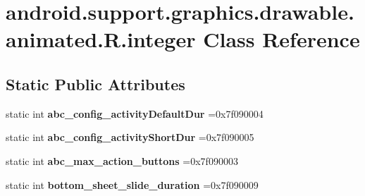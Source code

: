 \hypertarget{classandroid_1_1support_1_1graphics_1_1drawable_1_1animated_1_1R_1_1integer}{}\section{android.\+support.\+graphics.\+drawable.\+animated.\+R.\+integer Class Reference}
\label{classandroid_1_1support_1_1graphics_1_1drawable_1_1animated_1_1R_1_1integer}
\subsection*{Static Public Attributes}
\begin{DoxyCompactItemize}
\item 
\mbox{\label{classandroid_1_1support_1_1graphics_1_1drawable_1_1animated_1_1R_1_1integer_a449aa500af7a8ce23e01295a5da1255d}} 
static int {\bfseries abc\+\_\+config\+\_\+activity\+Default\+Dur} =0x7f090004
\item 
\mbox{\label{classandroid_1_1support_1_1graphics_1_1drawable_1_1animated_1_1R_1_1integer_a980a18f79f9a3e391738500043a8b230}} 
static int {\bfseries abc\+\_\+config\+\_\+activity\+Short\+Dur} =0x7f090005
\item 
\mbox{\label{classandroid_1_1support_1_1graphics_1_1drawable_1_1animated_1_1R_1_1integer_a5d125de4329eae4669c22002daa457b3}} 
static int {\bfseries abc\+\_\+max\+\_\+action\+\_\+buttons} =0x7f090003
\item 
\mbox{\label{classandroid_1_1support_1_1graphics_1_1drawable_1_1animated_1_1R_1_1integer_ac311f9415584b9955c48e90e3fe9e781}} 
static int {\bfseries bottom\+\_\+sheet\+\_\+slide\+\_\+duration} =0x7f090009
\item 
\mbox{\label{classandroid_1_1support_1_1graphics_1_1drawable_1_1animated_1_1R_1_1integer_a5e66fa9fc3b89dc8d6fbc38f9c31de68}} 

\end{DoxyCompactItemize}
